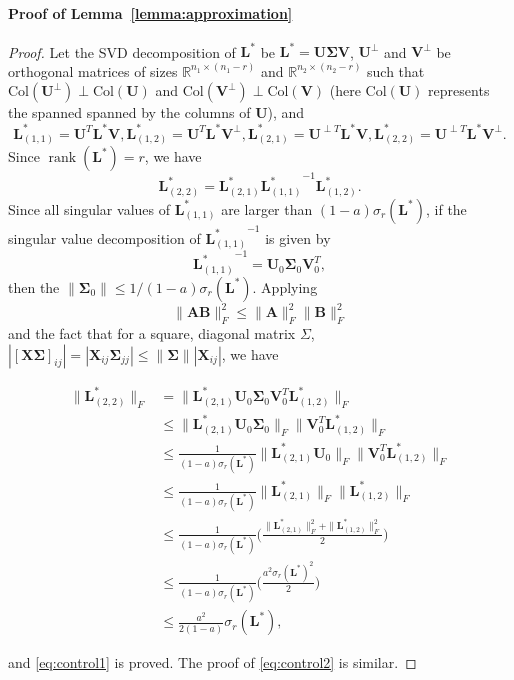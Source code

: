 \documentclass[12pt]{article}
\newcommand{\rank}{\operatorname{rank}}
\newcommand{\bX}{\boldsymbol{X}}
\newcommand{\bL}{\boldsymbol{L}}
\newcommand{\bSigma}{\boldsymbol\Sigma}
\newcommand{\bU}{\boldsymbol{U}}
\newcommand{\bV}{\boldsymbol{V}}
\def\reals{\mathbb{R}}
\def\bSigma{\boldsymbol\Sigma}
\def\bU{\boldsymbol{U}}
\def\bA{\boldsymbol{A}}
\def\bB{\boldsymbol{B}}
\def\Col{\mathrm{Col}}
\theoremstyle{plain}
\theoremstyle{definition}
\theoremstyle{plain}
\theoremstyle{plain}
\theoremstyle{remark}
\begin{document}
\paragraph*{Proof of Lemma~\ref{lemma:approximation}}
\begin{proof}
Let the SVD decomposition of $\bL^*$ be $\bL^*=\bU\bSigma\bV$,   $\bU^\perp$ and $\bV^\perp$ be orthogonal matrices of sizes $\reals^{n_1\times (n_1-r)}$ and $\reals^{n_2\times (n_2-r)}$ such that $\Col(\bU^\perp)\perp\Col(\bU)$ and $\Col(\bV^\perp)\perp\Col(\bV)$ (here $\Col(\bU)$ represents the spanned  spanned by the columns of $\bU$), and
\[
\bL^*_{(1,1)}=\bU^T\bL^*\bV, \bL^*_{(1,2)}=\bU^T\bL^*\bV^\perp, \bL^*_{(2,1)}=\bU^{\perp T}\bL^*\bV, \bL^*_{(2,2)}=\bU^{\perp T}\bL^*\bV^\perp.
\]
Since $\rank(\bL^*)=r$, we have
\[
\bL^*_{(2,2)}=\bL^*_{(2,1)}{\bL^*_{(1,1)}}^{-1}\bL^*_{(1,2)}.
\]
Since all singular values of $\bL^*_{(1,1)}$ are larger than $(1-a)\sigma_{r}(\bL^*)$, if the singular value decomposition of ${\bL^*_{(1,1)}}^{-1}$ is given by \[
{\bL^*_{(1,1)}}^{-1}=\bU_0\bSigma_0\bV_0^T,
\]
then the $\|\bSigma_0\|\leq 1/(1-a)\sigma_{r}(\bL^*)$. Applying 
\[
\|\bA\bB\|_F^2\leq \|\bA\|_F^2\|\bB\|_F^2
\]
and the fact that for a square, diagonal matrix $\Sigma$, $|[\bX\bSigma]_{ij}|=|\bX_{ij}\bSigma_{jj}|\leq \|\bSigma\||\bX_{ij}|$, we have 

\begin{align}
\|\bL_{(2,2)}^{*}\|_{F} & =\|\bL_{(2,1)}^{*}\bU_{0}\bSigma_{0}\bV_{0}^{T}\bL_{(1,2)}^{*}\|_{F}\nonumber\\
 & \leq\|\bL_{(2,1)}^{*}\bU_{0}\bSigma_{0}\|_{F}\|\bV_{0}^{T}\bL_{(1,2)}^{*}\|_{F}\nonumber\\
 & \leq\frac{1}{(1-a)\sigma_{r}(\bL^{*})}\|\bL_{(2,1)}^{*}\bU_{0}\|_{F}\|\bV_{0}^{T}\bL_{(1,2)}^{*}\|_{F}\nonumber\\
 & \leq\frac{1}{(1-a)\sigma_{r}(\bL^{*})}\|\bL_{(2,1)}^{*}\|_{F}\|\bL_{(1,2)}^{*}\|_{F}\nonumber\\
 & \leq\frac{1}{(1-a)\sigma_{r}(\bL^{*})}\Big(\frac{\|\bL_{(2,1)}^{*}\|_{F}^{2}+\|\bL_{(1,2)}^{*}\|_{F}^{2}}{2}\Big)\nonumber\\
 & \leq\frac{1}{(1-a)\sigma_{r}(\bL^{*})}\Big(\frac{a^{2}\sigma_{r}(\bL^{*})^{2}}{2}\Big)\nonumber\\
 & \leq\frac{a^{2}}{2(1-a)}\sigma_{r}(\bL^{*}),\label{eq:temp}
\end{align}

and \eqref{eq:control1} is proved. The proof of \eqref{eq:control2} is similar.
\end{proof}
\end{document}

